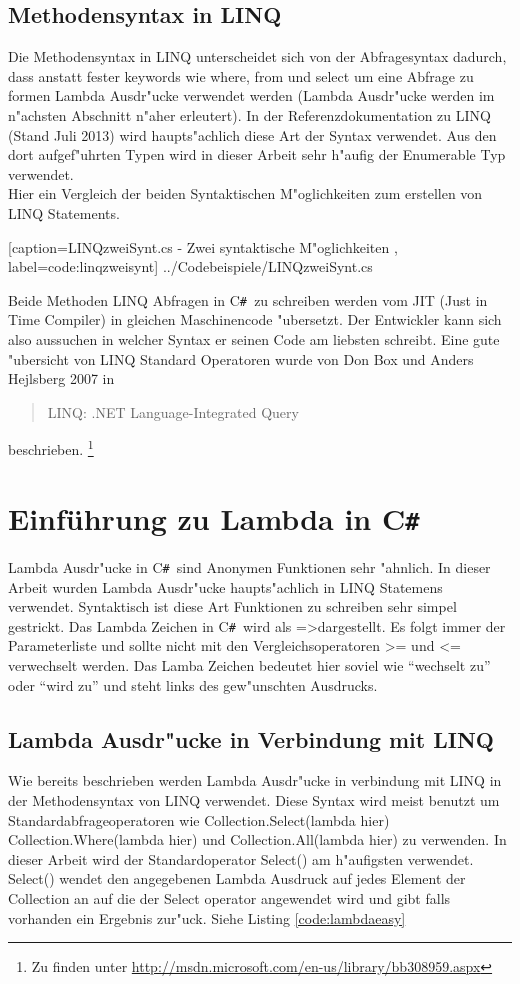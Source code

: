 \documentclass[pagesize, paper=a4, fontsize=12pt,titlepage=true, headings=small, headnosepline, abstractoff, liststotoc, nochapterprefix, plainheadsepline]{scrreprt}
\newcommand{\CS}{C\texttt{\#}}
\newcommand{\CSS}{C\texttt{\# }}
\newcommand{\LAM}{ =\textgreater\space}
\begin{document}
		\subsection {Methodensyntax in LINQ}
		Die Methodensyntax in LINQ unterscheidet sich von der Abfragesyntax dadurch, dass anstatt fester keywords wie where, from und select um eine Abfrage zu formen Lambda Ausdr"ucke verwendet werden (Lambda Ausdr"ucke werden im n"achsten Abschnitt n"aher erleutert). In der Referenzdokumentation zu LINQ (Stand Juli 2013) \cite{MicrosoftCReferenz.2013} wird haupts"achlich diese Art der Syntax verwendet. Aus den dort aufgef"uhrten Typen wird in dieser Arbeit sehr h"aufig der Enumerable Typ verwendet.
\\
Hier ein Vergleich der beiden Syntaktischen M"oglichkeiten zum erstellen von LINQ Statements.

			[caption={LINQzweiSynt.cs - Zwei syntaktische M"oglichkeiten} \protect\cite{MicrosoftCReferenz.2013}, label=code:linqzweisynt]
			{../Codebeispiele/LINQzweiSynt.cs}

Beide Methoden LINQ Abfragen in \CSS zu schreiben werden vom JIT (Just in Time Compiler) in gleichen Maschinencode "ubersetzt. Der Entwickler kann sich also aussuchen in welcher Syntax er seinen Code am liebsten schreibt. Eine gute "ubersicht von LINQ Standard Operatoren wurde von Don Box und Anders Hejlsberg 2007 in \begin{quote}LINQ: .NET Language-Integrated Query \cite[Standard Query Operators in a Nutshell]{Box.2007}\end{quote} beschrieben. \footnote[1]{Zu finden unter \url{http://msdn.microsoft.com/en-us/library/bb308959.aspx}}
	\section {Einführung zu Lambda in \CS}
		Lambda Ausdr"ucke in \CSS sind Anonymen Funktionen sehr "ahnlich. In dieser Arbeit wurden Lambda Ausdr"ucke haupts"achlich in LINQ Statemens verwendet. Syntaktisch ist diese Art Funktionen zu schreiben sehr simpel gestrickt. Das Lambda Zeichen in \CSS wird als \LAM dargestellt. Es folgt immer der Parameterliste und sollte nicht mit den Vergleichsoperatoren \textgreater = und \textless = verwechselt werden. Das Lamba Zeichen bedeutet hier soviel wie "`wechselt zu"' oder "`wird zu"' und steht links des gew"unschten Ausdrucks.
		\subsection {Lambda Ausdr"ucke in Verbindung mit LINQ}
Wie bereits beschrieben werden Lambda Ausdr"ucke  in verbindung mit LINQ in der Methodensyntax von LINQ verwendet. Diese Syntax wird meist benutzt um Standardabfrageoperatoren wie Collection.Select(lambda hier) Collection.Where(lambda hier) und Collection.All(lambda hier) zu verwenden. In dieser Arbeit wird der Standardoperator Select() am h"aufigsten verwendet. Select() wendet den angegebenen Lambda Ausdruck auf jedes Element der Collection an auf die der Select operator angewendet wird und gibt falls vorhanden ein Ergebnis zur"uck. Siehe Listing \ref{code:lambdaeasy}
\end{document}
